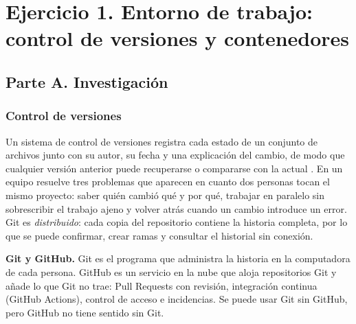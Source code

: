 \hypertarget{ejercicio-1.-entorno-de-trabajo-control-de-versiones-y-contenedores}{%
\section{Ejercicio 1. Entorno de trabajo: control de versiones y contenedores}\label{ejercicio-1.-entorno-de-trabajo-control-de-versiones-y-contenedores}}

\hypertarget{parte-a.-investigaciuxf3n}{%
\subsection{Parte A. Investigación}\label{parte-a.-investigaciuxf3n}}

\hypertarget{control-de-versiones}{%
\subsubsection{Control de versiones}\label{control-de-versiones}}

Un sistema de control de versiones registra cada estado de un conjunto de archivos junto con su autor, su fecha y una explicación del cambio, de modo que cualquier versión anterior puede recuperarse o compararse con la actual \autocite[cap. 1]{chacon2014}. En un equipo resuelve tres problemas que aparecen en cuanto dos personas tocan el mismo proyecto: saber quién cambió qué y por qué, trabajar en paralelo sin sobrescribir el trabajo ajeno y volver atrás cuando un cambio introduce un error. Git es \emph{distribuido}: cada copia del repositorio contiene la historia completa, por lo que se puede confirmar, crear ramas y consultar el historial sin conexión.

\textbf{Git y GitHub.} Git es el programa que administra la historia en la computadora de cada persona. GitHub es un servicio en la nube que aloja repositorios Git y añade lo que Git no trae: Pull Requests con revisión, integración continua (GitHub Actions), control de acceso e incidencias. Se puede usar Git sin GitHub, pero GitHub no tiene sentido sin Git.

